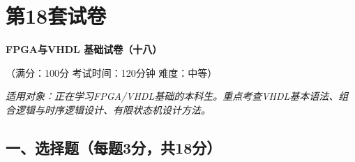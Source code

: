 \chapter{第18套试卷}

\begin{center}
\textbf{FPGA与VHDL 基础试卷（十八）}

（满分：100分 \hspace{2em} 考试时间：120分钟 \hspace{2em} 难度：中等）

\vspace{0.3cm}
\textit{适用对象：正在学习FPGA/VHDL基础的本科生。重点考查VHDL基本语法、组合逻辑与时序逻辑设计、有限状态机设计方法。}
\end{center}

\section*{一、选择题（每题3分，共18分）}

